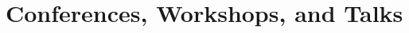 \documentclass[letterpaper,10.5pt]{article}
\begin{document}


\section{Conferences, Workshops, and Talks}
\end{document}
